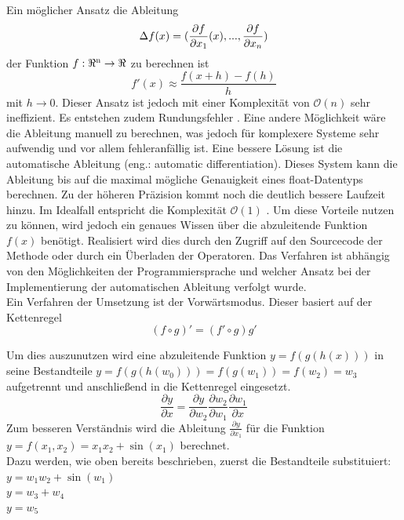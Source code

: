 \documentclass{like}
\begin{document}
Ein möglicher Ansatz die Ableitung 
\begin{equation}
	\Delta{\tiny } f(x) = (\frac{\partial f}{\partial x_1} (x), ..., \frac{\partial f}{\partial x_n})
\end{equation}
der Funktion $f:\Re \textsuperscript{n} \rightarrow \Re $ zu berechnen ist \\
\begin{equation}
	f'(x) \approx \frac{f(x+h) - f(h)}{h}
\end{equation}
 mit $ h \rightarrow 0$.
Dieser Ansatz ist jedoch mit einer Komplexität von $\mathcal{O}(n)$ sehr ineffizient. Es entstehen zudem Rundungsfehler \cite{julDiff}.
Eine andere Möglichkeit wäre die Ableitung manuell zu berechnen, was jedoch für komplexere Systeme sehr aufwendig und vor allem fehleranfällig ist. Eine bessere Lösung ist die automatische Ableitung (eng.: automatic differentiation). 
Dieses System kann die Ableitung bis auf die maximal mögliche Genauigkeit eines float-Datentyps berechnen. Zu der höheren Präzision kommt noch die deutlich bessere Laufzeit hinzu. Im Idealfall entspricht die Komplexität $\mathcal{O}(1)$ \cite{julDiff}. Um diese Vorteile nutzen zu können, wird jedoch ein genaues Wissen über die abzuleitende Funktion \(f(x)\) benötigt. Realisiert wird dies durch den Zugriff auf den Sourcecode der Methode oder durch ein Überladen der Operatoren. Das Verfahren ist abhängig von den Möglichkeiten der Programmiersprache und welcher Ansatz bei der Implementierung der automatischen Ableitung verfolgt wurde. \\

Ein Verfahren der Umsetzung ist der Vorwärtsmodus. Dieser basiert auf der Kettenregel 
\begin{equation}
	(f \circ g)' = (f' \circ g)g'
\end{equation}

Um dies auszunutzen wird eine abzuleitende Funktion $ y = f(g(h(x)))$ in seine Bestandteile $y = f(g(h(w_0))) = f(g(w_1)) = f(w_2) = w_3$ aufgetrennt und anschließend in die Kettenregel eingesetzt. 
\begin{equation}
\frac{\partial y}{\partial x} = \frac{\partial y}{\partial w_2} \frac{\partial w_2}{\partial w_1} \frac{\partial w_1}{\partial x}
\end{equation}
Zum besseren Verständnis wird die Ableitung $\frac{\partial y}{\partial x_1}$ für die Funktion
$y = f(x_1, x_2) = x_1x_2 + \sin(x_1)$  berechnet.\\
Dazu werden, wie oben bereits beschrieben, zuerst die Bestandteile substituiert:\\
$y = w_1w_2 + \sin(w_1) $ \\
$y = w_3 + w_4$ \\
$y = w_5$
\end{document}
